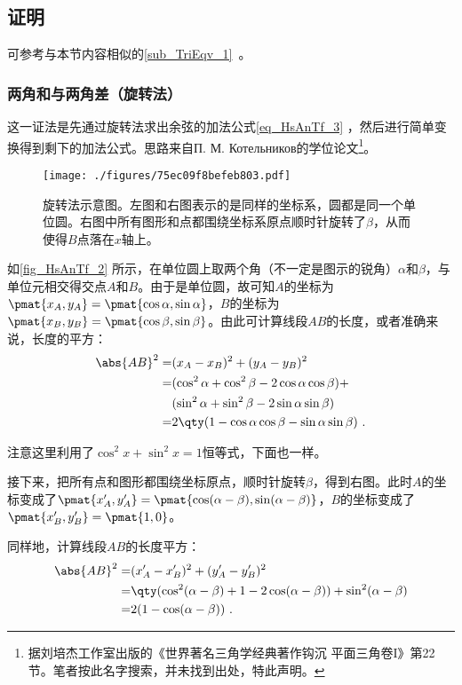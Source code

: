 \subsection{证明}

可参考与本节内容相似的\autoref{sub_TriEqv_1}~。

\subsubsection{两角和与两角差（旋转法）}

这一证法是先通过旋转法求出余弦的加法公式\autoref{eq_HsAnTf_3} ，然后进行简单变换得到剩下的加法公式。思路来自П. М. Котельников的学位论文\footnote{据刘培杰工作室出版的《世界著名三角学经典著作钩沉 平面三角卷I》第22节。笔者按此名字搜索，并未找到出处，特此声明。}。

\begin{figure}[ht]
\centering
\texttt{[image: ./figures/75ec09f8befeb803.pdf]}
\caption{旋转法示意图。左图和右图表示的是同样的坐标系，圆都是同一个单位圆。右图中所有图形和点都围绕坐标系原点顺时针旋转了$\beta$，从而使得$B$点落在$x$轴上。} \label{fig_HsAnTf_2}
\end{figure}


如\autoref{fig_HsAnTf_2} 所示，在单位圆上取两个角（不一定是图示的锐角）$\alpha$和$\beta$，与单位元相交得交点$A$和$B$。由于是单位圆，故可知$A$的坐标为$\pmat{x_A, y_A}=\pmat{\cos\alpha, \sin\alpha}$，$B$的坐标为$\pmat{x_B, y_B}=\pmat{\cos\beta, \sin\beta}$。由此可计算线段$AB$的长度，或者准确来说，长度的平方：
\begin{equation}\label{eq_HsAnTf_1}
\begin{aligned}
\abs{AB}^2 =& (x_A-x_B)^2+(y_A-y_B)^2\\
=& (\cos^2\alpha+\cos^2\beta-2\cos\alpha\cos\beta)+\\&(\sin^2\alpha+\sin^2\beta-2\sin\alpha\sin\beta)\\
=& 2\qty(1-\cos\alpha\cos\beta-\sin\alpha\sin\beta)~.
\end{aligned}
\end{equation}

注意这里利用了$\cos^2x+\sin^2x=1$恒等式，下面也一样。

接下来，把所有点和图形都围绕坐标原点，顺时针旋转$\beta$，得到右图。此时$A$的坐标变成了$\pmat{x'_A, y'_A}=\pmat{\cos(\alpha-\beta), \sin(\alpha-\beta)}$，$B$的坐标变成了$\pmat{x'_B, y'_B}=\pmat{1, 0}$。

同样地，计算线段$AB$的长度平方：
\begin{equation}\label{eq_HsAnTf_2}
\begin{aligned}
\abs{AB}^2 =& (x'_A-x'_B)^2+(y'_A-y'_B)^2\\
=& \qty(\cos^2(\alpha-\beta)+1-2\cos(\alpha-\beta))+\sin^2(\alpha-\beta)\\
=& 2(1-\cos(\alpha-\beta))~.
\end{aligned}
\end{equation}

